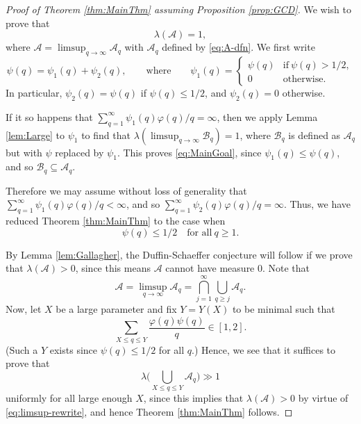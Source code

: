 \documentclass[12pt]{amsart}
\numberwithin{equation}{section}
\theoremstyle{definition}
\theoremstyle{remark}
\newcommand{\CA}{\mathcal{A}}
\newcommand{\CB}{\mathcal{B}}
\renewcommand{\phi}{\varphi}
\renewcommand{\le}{\leqslant}
\renewcommand{\ge}{\geqslant}
\begin{document}
\begin{proof}[Proof of Theorem \ref{thm:MainThm} assuming Proposition \ref{prop:GCD}]
We wish to prove that
\begin{equation}\label{eq:MainGoal}
\lambda(\CA)=1,
\end{equation}
where $\CA=\limsup_{q\to\infty}\CA_q$ with $\CA_q$ defined by \eqref{eq:A-dfn}. We first  write 
\[
\psi(q)=\psi_1(q)+\psi_2(q),
\qquad\text{where}\qquad
\psi_1(q)
	=\begin{cases}
	\psi(q)&\text{if}\ \psi(q)>1/2,\\
	0&\text{otherwise} .
	\end{cases}
\] 
In particular, $\psi_2(q)=\psi(q)$ if $\psi(q)\le 1/2$, and $\psi_2(q)=0$ otherwise. 

If it so happens that $\sum_{q=1}^\infty \psi_1(q)\phi(q)/q=\infty$, then we apply Lemma \ref{lem:Large} to $\psi_1$ to find that $\lambda(\limsup_{q\to\infty}\CB_q)=1$, where $\CB_q$ is defined as $\CA_q$ but with $\psi$ replaced by $\psi_1$. This proves \eqref{eq:MainGoal}, since $\psi_1(q)\le \psi(q)$, and so $\CB_q\subseteq\CA_q$.

Therefore we may assume without loss of generality that $\sum_{q=1}^\infty \psi_1(q)\phi(q)/q<\infty$, and so $\sum_{q=1}^\infty \psi_2(q)\phi(q)/q=\infty$. 
Thus, we have reduced Theorem \ref{thm:MainThm} to the case when 
\[
\psi(q)\le 1/2\quad\text{for all}\ q\ge1. 
\]

By Lemma \ref{lem:Gallagher}, the Duffin-Schaeffer conjecture will follow if we prove that $\lambda(\CA)>0$, 
since this means $\CA$ cannot have measure 0. Note that 
\begin{equation}
\label{eq:limsup-rewrite}
\CA=\limsup_{q\to\infty}\CA_q =  \bigcap_{j=1}^{\infty}
\bigcup_{q\ge j}\CA_q .
\end{equation}
Now, let $X$ be a large parameter and fix $Y=Y(X)$ to be minimal such that
\[
\sum_{X\le q\le Y} \frac{\phi(q)\psi(q)}{q} \in[1,2] .
\]
(Such a $Y$ exists since $\psi(q)\le 1/2$ for all $q$.) Hence, we see that it suffices to prove that
\begin{equation}
\lambda\bigg(\bigcup_{X\le q\le Y} \CA_q\bigg)\gg1 
\label{eq:Finite}
\end{equation}
uniformly for all large enough $X$, since this implies that $\lambda(\CA)>0$ by virtue of \eqref{eq:limsup-rewrite}, and hence Theorem \ref{thm:MainThm} follows.


\end{proof}
\end{document}

